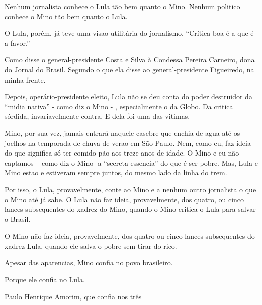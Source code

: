 



Nenhum jornalista conhece o Lula tão bem quanto o Mino.
Nenhum politico conhece o Mino tão bem quanto o Lula.

O Lula, porém, já teve uma visao utilitária do jornalismo.
“Crítica boa é a que é a favor.”

Como disse o general-presidente Costa e Silva à Condessa Pereira Carneiro, dona do Jornal do Brasil.
Segundo o que ela disse ao general-presidente Figueiredo, na minha frente.

Depois, operário-presidente eleito, Lula não se deu conta do poder destruidor da “midia nativa” - como diz o Mino - , especialmente o da Globo.
Da critica sórdida, invariavelmente contra.
E dela foi uma das vitimas.

Mino, por sua vez, jamais entrará naquele casebre que enchia de agua até os joelhos na temporada de chuva de verao em São Paulo.
Nem, como eu, faz ideia do que significa só ter comido pão aos treze anos de idade.
O Mino e eu não captamos – como diz o Mino- a “secreta essencia” do que é ser pobre.
Mas, Lula e Mino estao e estiveram sempre juntos, do mesmo lado da linha do trem.

Por isso, o Lula, provavelmente, conte ao Mino e a nenhum outro jornalista o que o Mino até já sabe.
O Lula não faz ideia, provavelmente, dos quatro, ou cinco lances subsequentes do xadrez do Mino, quando o Mino critica o Lula para salvar o Brasil.

O Mino não faz ideia, provavelmente, dos quatro ou cinco lances subsequentes do xadrez Lula, quando ele salva o pobre sem tirar do rico.

Apesar das aparencias, Mino confia no povo brasileiro.

Porque ele confia no Lula.
\medskip

Paulo Henrique Amorim, que confia nos três





